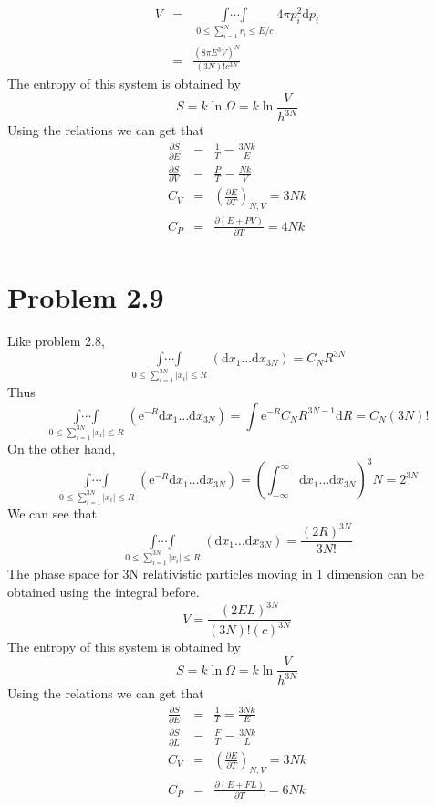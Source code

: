 \documentclass{article}
\begin{document}
\begin{eqnarray}
V&=&\mathop{\int\cdots\int}\limits_{0\le\sum\limits_{i=1}^{N}r_i\le E/c}4\pi p_i^2\mathrm{d}p_i\\&=&\frac{(8\pi E^3V)^N}{(3N)! c^{3N}}
\end{eqnarray}
The entropy of this system is obtained by 
\begin{equation}
S=k\ln\Omega=k\ln\frac{V}{h^{3N}}
\end{equation}
Using the relations we can get that
\begin{eqnarray}
\frac{\partial S}{\partial E}&=&\frac{1}{T}=\frac{3Nk}{E}\\
\frac{\partial S}{\partial V}&=&\frac{P}{T}=\frac{Nk}{V}\\
C_V&=&(\frac{\partial E}{\partial T})_{N,V}=3Nk\\
C_P&=&\frac{\partial(E+PV)}{\partial T}=4Nk\\
\end{eqnarray}

\section*{Problem 2.9}
Like problem 2.8,
\begin{equation}
\mathop{\int\cdots\int}\limits_{0\le\sum\limits_{i=1}^{3N}|x_i|\le R}(\mathrm{d}x_1\dots\mathrm{d}x_{3N})=C_NR^{3N}
\end{equation}
Thus
\begin{equation}
\mathop{\int\cdots\int}\limits_{0\le\sum\limits_{i=1}^{3N}|x_i|\le R}(\mathrm{e}^{-R}\mathrm{d}x_1\dots\mathrm{d}x_{3N})=\int\mathrm{e}^{-R}C_NR^{3N-1}\mathrm{d}R=C_N(3N)!
\end{equation}
On the other hand,
\begin{equation}
\mathop{\int\cdots\int}\limits_{0\le\sum\limits_{i=1}^{3N}|x_i|\le R}(\mathrm{e}^{-R}\mathrm{d}x_1\dots\mathrm{d}x_{3N})=(\int_{-\infty}^{\infty}\mathrm{d}x_1\dots\mathrm{d}x_{3N})^3N=2^{3N}
\end{equation}
We can see that
\begin{equation}
\mathop{\int\cdots\int}\limits_{0\le\sum\limits_{i=1}^{3N}|x_i|\le R}(\mathrm{d}x_1\dots\mathrm{d}x_{3N})=\frac{(2R)^{3N}}{3N!}
\end{equation}
The phase space for 3N relativistic particles moving in 1 dimension can be obtained using the integral before.
\begin{equation}
V=\frac{(2EL)^{3N}}{(3N)!(c)^{3N}}
\end{equation}
The entropy of this system is obtained by 
\begin{equation}
S=k\ln\Omega=k\ln\frac{V}{h^{3N}}
\end{equation}
Using the relations we can get that
\begin{eqnarray}
\frac{\partial S}{\partial E}&=&\frac{1}{T}=\frac{3Nk}{E}\\
\frac{\partial S}{\partial L}&=&\frac{F}{T}=\frac{3Nk}{L}\\
C_V&=&(\frac{\partial E}{\partial T})_{N,V}=3Nk\\
C_P&=&\frac{\partial(E+FL)}{\partial T}=6Nk\\
\end{eqnarray}
\end{document}
